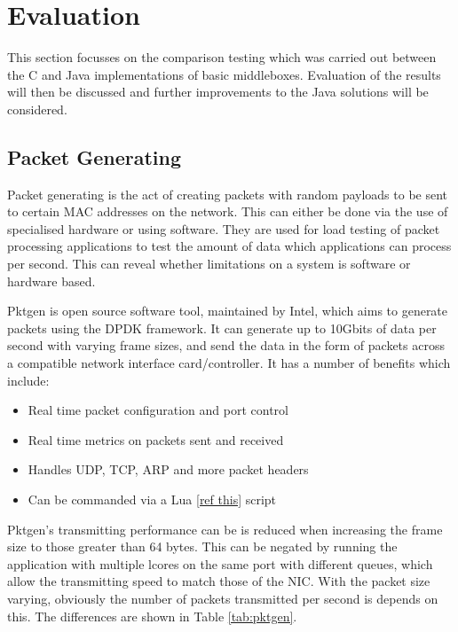 \documentclass[final_report.tex]{subfiles}
\begin{document}
\section{Evaluation}

This section focusses on the comparison testing which was carried out between the C and Java implementations of basic middleboxes. Evaluation of the results will then be discussed and further improvements to the Java solutions will be considered.  

\subsection{Packet Generating}
Packet generating is the act of creating packets with random payloads to be sent to certain MAC addresses on the network. This can either be done via the use of specialised hardware or using software. They are used for load testing of packet processing applications to test the amount of data which applications can process per second. This can reveal whether limitations on a system is software or hardware based.


Pktgen is open source software tool, maintained by Intel, which aims to generate packets using the DPDK framework. It can generate up to 10Gbits of data per second with  varying frame sizes, and send the data in the form of packets across a compatible network interface card/controller. It has a number of benefits which include:

\begin{itemize}
	\item Real time packet configuration and port control
	\item Real time metrics on packets sent and received
	\item Handles UDP, TCP, ARP and more packet headers
	\item Can be commanded via a Lua \ref{ref this} script
\end{itemize}


Pktgen's transmitting performance can be is reduced when increasing the frame size to those greater than 64 bytes. This can be negated by running the application with multiple lcores on the same port with different queues, which allow the transmitting speed to match those of the NIC. With the packet size varying, obviously the number of packets transmitted per second is depends on this. The differences are shown in Table \ref{tab:pktgen}.
\end{document}
